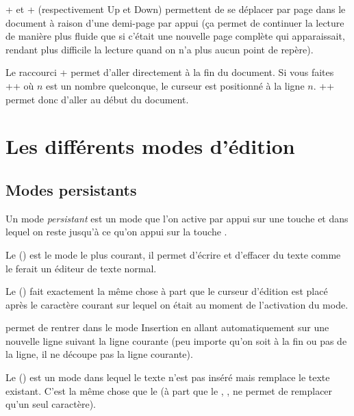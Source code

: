 \documentclass[a4paper,twoside]{article}
\begin{document}
\bigskip

+ et + (respectivement Up et Down) permettent de se déplacer par page dans le document à raison d'une demi-page par appui (ça permet de continuer la lecture de manière plus fluide que si c'était une nouvelle page complète qui apparaissait, rendant plus difficile la lecture quand on n'a plus aucun point de repère).

\bigskip

Le raccourci + permet d'aller directement à la fin du document. Si vous faites\\
++ où $n$ est un nombre quelconque, le curseur est positionné à la ligne $n$. ++ permet donc d'aller au début du document.


\section{Les différents modes d'édition}
\subsection{Modes \og persistants\fg}
Un mode \emph{persistant} est un mode que l'on active par appui sur une touche et dans lequel on reste jusqu'à ce qu'on appui sur la touche .

\bigskip

Le  () est le mode le plus courant, il permet d'écrire et d'effacer du texte comme le ferait un éditeur de texte normal.

Le  () fait exactement la même chose à part que le curseur d'édition est placé après le caractère courant sur lequel on était au moment de l'activation du mode.

 permet de rentrer dans le mode Insertion en allant automatiquement sur une nouvelle ligne suivant la ligne courante (peu importe qu'on soit à la fin ou pas de la ligne, il ne découpe pas la ligne courante).

\bigskip

Le  () est un mode dans lequel le texte n'est pas inséré mais remplace le texte existant. C'est la même chose que le  (à part que le , , ne permet de remplacer qu'un seul caractère).
\end{document}
